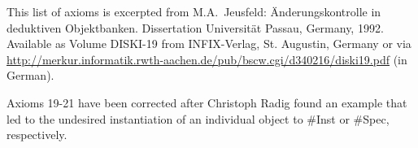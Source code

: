 This list of axioms is excerpted from
M.A.~Jeusfeld: \"Anderungskontrolle in deduktiven Objektbanken.
Dissertation Universit\"at Passau, Germany, 1992. Available
as Volume DISKI-19 from INFIX-Verlag, St. Augustin, Germany or
via \url{http://merkur.informatik.rwth-aachen.de/pub/bscw.cgi/d340216/diski19.pdf} (in German).

Axioms 19-21 have been corrected after Christoph Radig found
an example that led to the undesired instantiation of an
individual object to \#Inst or \#Spec, respectively.




